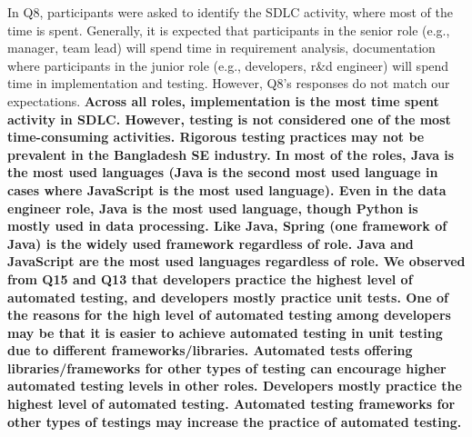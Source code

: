 In Q8, participants were asked to identify the SDLC activity, where most of the time is spent. Generally, it is expected that participants in the senior role (e.g., manager, team lead) will spend time in requirement analysis, documentation where participants in the junior role (e.g., developers, r\&d engineer) will spend time in implementation and testing. However, Q8's responses do not match our expectations. \bf{Across all roles, implementation is the most time spent activity in SDLC. However, testing is not considered one of the most time-consuming activities. Rigorous testing practices may not be prevalent in the Bangladesh SE industry.}
In most of the roles, Java is the most used languages (Java is the second most used language in cases where JavaScript is the most used language). Even in the data engineer role, Java is the most used language, though Python is mostly used in data processing. Like Java, Spring (one framework of Java) is the widely used framework regardless of role.
\bf{Java and JavaScript are the most used languages regardless of role.}
We observed from Q15 and Q13 that developers practice the highest level of automated testing, and developers mostly practice unit tests. One of the reasons for the high level of automated testing among developers may be that it is easier to achieve automated testing in unit testing due to different frameworks/libraries. Automated tests offering libraries/frameworks for other types of testing can encourage higher automated testing levels in other roles.
\bf{Developers mostly practice the highest level of automated testing. Automated testing frameworks for other types of testings may increase the practice of automated testing.}